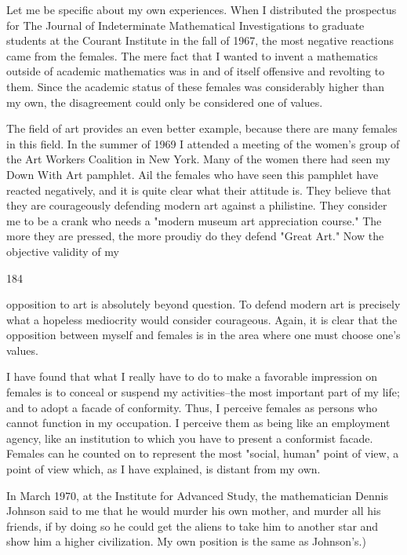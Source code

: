 \documentclass[10pt,twoside]{memoir}
\begin{document}
\begin{enumerate}
{{Let me be specific about my own experiences. When I distributed the 
prospectus for The Journal of Indeterminate Mathematical Investigations to 
graduate students at the Courant Institute in the fall of 1967, the most 
negative reactions came from the females. The mere fact that I wanted to 
invent a mathematics outside of academic mathematics was in and of itself 
offensive and revolting to them. Since the academic status of these females 
was considerably higher than my own, the disagreement could only be 
considered one of values. 

The field of art provides an even better example, because there are 
many females in this field. In the summer of 1969 I attended a meeting of 
the women's group of the Art Workers Coalition in New York. Many of the 
women there had seen my Down With Art pamphlet. Ail the females who 
have seen this pamphlet have reacted negatively, and it is quite clear what 
their attitude is. They believe that they are courageously defending modern 
art against a philistine. They consider me to be a crank who needs a "modern 
museum art appreciation course." The more they are pressed, the more 
proudiy do they defend "Great Art." Now the objective validity of my 


184 


opposition to art is absolutely beyond question. To defend modern art is 
precisely what a hopeless mediocrity would consider courageous. Again, it is 
clear that the opposition between myself and females is in the area where 
one must choose one's values. 

I have found that what I really have to do to make a favorable 
impression on females is to conceal or suspend my activities--the most 
important part of my life; and to adopt a facade of conformity. Thus, I 
perceive females as persons who cannot function in my occupation. I 
perceive them as being like an employment agency, like an institution to 
which you have to present a conformist facade. Females can he counted on to 
represent the most "social, human" point of view, a point of view which, as I 
have explained, is distant from my own. {In March 1970, at the Institute for 
Advanced Study, the mathematician Dennis Johnson said to me that he 
would murder his own mother, and murder all his friends, if by doing so he 
could get the aliens to take him to another star and show him a higher 
civilization. My own position is the same as Johnson's.) 

}}}
\end{enumerate}
\end{document}
